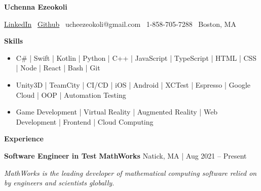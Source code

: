 \documentclass[10pt]{article}
\begin{document}
\begin{center}
    \textbf{Uchenna Ezeokoli}\\ 
    \hrulefill
\end{center}

\begin{center}
    \href{https://www.linkedin.com/in/uchenna-ezeokoli/}{LinkedIn} 
    \textbullet \ \href{https://github.com/ucheezeokoli}{Github} \textbullet \ ucheezeokoli@gmail.com \textbullet \ 1-858-705-7288 \textbullet \ Boston, MA 
\end{center}

\begin{center}
    \textbf{Skills}
    \hrulefill
\end{center}

\begin{itemize}[noitemsep]
    \item C\# | Swift | Kotlin | Python | C++ |
    JavaScript | TypeScript | HTML | CSS | Node | React | Bash | Git
    \item Unity3D | TeamCity | CI/CD | iOS | Android | XCTest | 
    Espresso | Google Cloud | OOP | Automation Testing
    \item Game Development | Virtual Reality | Augmented Reality | Web Development | Frontend |
    Cloud Computing 
\end{itemize}

\begin{center}
    \textbf{Experience}
    \hrulefill
\end{center}

\textbf{Software Engineer in Test} \hfill \textbf{MathWorks} \hfill Natick, MA | Aug 2021 – Present

\textit{MathWorks is the leading developer of mathematical computing software relied on by engineers and scientists globally.}

\vspace{1pt}
\end{document}
